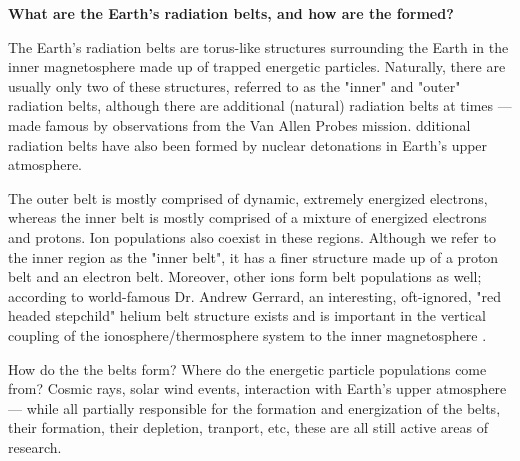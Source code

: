 \textbf{What are the Earth’s radiation belts, and how are the formed?}
 
The Earth's radiation belts are torus-like structures surrounding the
Earth in the inner magnetosphere made up of trapped energetic particles.
Naturally, there are usually only two of these structures, referred to
as the "inner" and "outer" radiation belts, although there are
additional (natural) radiation belts at times --- made famous by
observations from the Van Allen Probes mission. dditional radiation
belts
have also been formed by nuclear detonations in Earth's upper atmosphere. 

The outer belt is mostly comprised of dynamic, extremely energized
electrons, whereas the inner belt is mostly comprised of a mixture of
energized electrons and protons. Ion populations also coexist in these
regions. Although we refer to the inner region as the
"inner belt", it has a finer structure made up of a proton belt and an
electron belt. Moreover, other ions form belt populations as
well; according to world-famous Dr. Andrew Gerrard, an
interesting, oft-ignored, "red headed stepchild" helium belt structure
exists and is important in the vertical coupling of the
ionosphere/thermosphere system to the inner magnetosphere
\citep{Gerrard2014}.

How do the the belts form? Where do the energetic particle populations
come from? Cosmic rays, solar wind events, interaction with Earth's upper
atmosphere --- while all partially responsible for the formation and energization
of the belts, their formation, their depletion, tranport, etc, these are all still
active areas of research.
